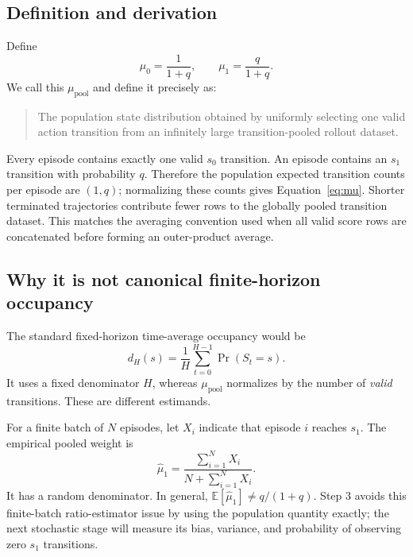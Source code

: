 \documentclass[10pt,a4paper]{article}
\newcommand{\pool}{\mathrm{pool}}
\newcommand{\E}{\mathbb{E}}
\begin{document}
\subsection{Definition and derivation}

Define
\begin{equation}
\boxed{\mu_0=\frac1{1+q},\qquad \mu_1=\frac q{1+q}.}
\label{eq:mu}
\end{equation}
We call this $\mu_{\pool}$ and define it precisely as:
\begin{quote}
The population state distribution obtained by uniformly selecting one valid
action transition from an infinitely large transition-pooled rollout dataset.
\end{quote}

Every episode contains exactly one valid $s_0$ transition.  An episode contains
an $s_1$ transition with probability $q$.  Therefore the population expected
transition counts per episode are $(1,q)$; normalizing these counts gives
Equation~\eqref{eq:mu}.  Shorter terminated trajectories contribute fewer rows
to the globally pooled transition dataset.  This matches the averaging
convention used when all valid score rows are concatenated before forming an
outer-product average.

\subsection{Why it is not canonical finite-horizon occupancy}

The standard fixed-horizon time-average occupancy would be
\begin{equation}
d_H(s)=\frac1H\sum_{t=0}^{H-1}\Pr(S_t=s).
\end{equation}
It uses a fixed denominator $H$, whereas $\mu_{\pool}$ normalizes by the number
of \emph{valid} transitions.  These are different estimands.

For a finite batch of $N$ episodes, let $X_i$ indicate that episode $i$ reaches
$s_1$.  The empirical pooled weight is
\begin{equation}
\widehat\mu_1
=\frac{\sum_{i=1}^{N}X_i}{N+\sum_{i=1}^{N}X_i}.
\label{eq:ratio-estimator}
\end{equation}
It has a random denominator.  In general,
$\E[\widehat\mu_1]\neq q/(1+q)$.  Step 3 avoids this finite-batch ratio-estimator
issue by using the population quantity exactly; the next stochastic stage will
measure its bias, variance, and probability of observing zero $s_1$ transitions.
\end{document}
